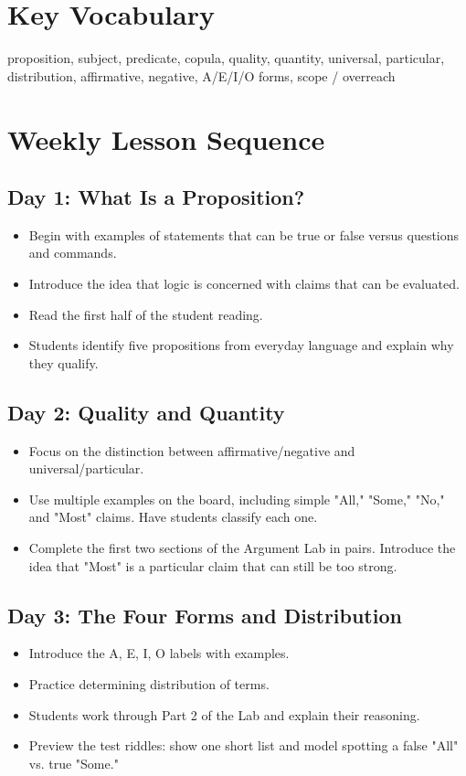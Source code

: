 \documentclass[12pt]{article}
\begin{document}
\section*{Key Vocabulary}
proposition, subject, predicate, copula, quality, quantity, universal, particular, distribution, affirmative, negative, A/E/I/O forms, scope / overreach

\section*{Weekly Lesson Sequence}

\subsection*{Day 1: What Is a Proposition?}
\begin{itemize}[leftmargin=*]
\item Begin with examples of statements that can be true or false versus questions and commands.
\item Introduce the idea that logic is concerned with claims that can be evaluated.
\item Read the first half of the student reading.
\item Students identify five propositions from everyday language and explain why they qualify.
\end{itemize}

\subsection*{Day 2: Quality and Quantity}
\begin{itemize}[leftmargin=*]
\item Focus on the distinction between affirmative/negative and universal/particular.
\item Use multiple examples on the board, including simple "All," "Some," "No," and "Most" claims. Have students classify each one.
\item Complete the first two sections of the Argument Lab in pairs. Introduce the idea that "Most" is a particular claim that can still be too strong.
\end{itemize}

\subsection*{Day 3: The Four Forms and Distribution}
\begin{itemize}[leftmargin=*]
\item Introduce the A, E, I, O labels with examples.
\item Practice determining distribution of terms.
\item Students work through Part 2 of the Lab and explain their reasoning.
\item Preview the test riddles: show one short list and model spotting a false "All" vs. true "Some."
\end{itemize}
\end{document}
